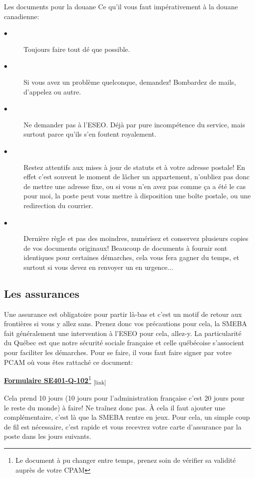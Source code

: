 \begin{example}{Les documents pour la douane}
 Ce qu'il vous faut impérativement à la douane canadienne:
 \begin{description}
   \item[$\bullet$]Toujours faire tout dé que possible.
   \item[$\bullet$]Si vous avez un problème quelconque, demandez! Bombardez de mails, d’appelez ou autre.
   \item[$\bullet$]Ne demander pas à l’ESEO. Déjà par pure incompétence du service, mais surtout parce qu’ils s’en foutent royalement.
   \item[$\bullet$]Restez attentifs aux mises à jour de statuts et à votre adresse postale!
   En effet c’est souvent le moment de lâcher un appartement, n’oubliez pas donc de mettre une adresse fixe, ou si vous n’en avez pas comme ça a été le cas pour moi, la poste peut vous mettre à disposition une boîte postale, ou une redirection du courrier.
   \item[$\bullet$]Dernière règle et pas des moindres, numérisez et conservez plusieurs copies de vos documents originaux! Beaucoup de documents à fournir sont identiques pour certaines démarches, cela vous fera gagner du temps, et surtout si vous devez en renvoyer un en urgence...
 \end{description}
\end{example}


 \subsection{Les assurances}\label{sec:sec3.2.7}
 Une assurance est obligatoire pour partir là-bas et c'est un motif de retour aux frontières si vous y allez sans. Prenez donc vos précautions pour cela, la SMEBA fait généralement une intervention à l'ESEO pour cela, allez-y. La particularité du Québec est que notre sécurité sociale française et celle québécoise s'associent pour faciliter les démarches. Pour se faire, il vous faut faire signer par votre PCAM où vous êtes rattaché ce document:

 \bigbreak
 \href{Annexes/Sherbrooke/SE401-Q-102.pdf}{\textbf{Formulaire SE401-Q-102}\footnote{Le document à pu changer entre temps, prenez soin de vérifier sa validité auprès de votre CPAM}}\textsubscript{  [link]}
 \bigbreak


 Cela prend 10 jours (10 jours pour l'administration française c'est 20 jours pour le reste du monde) à faire! Ne traînez donc pas.
 À cela il faut ajouter une complémentaire, c'est là que la SMEBA rentre en jeux. Pour cela, un simple coup de fil est nécessaire, c'est rapide et vous recevrez votre carte d'assurance par la poste dans les jours suivants.


